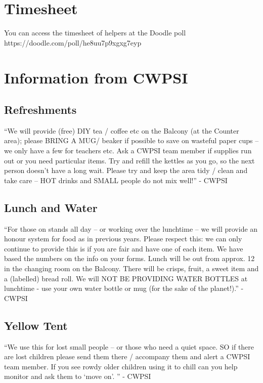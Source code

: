 \documentclass[a4paper]{article}
\begin{document}
\section*{Timesheet}
You can access the timesheet of helpers at the Doodle poll https://doodle.com/poll/he8uu7p9xgxg7eyp


\section*{Information from CWPSI}
\subsection*{Refreshments}
``We will provide (free) DIY tea / coffee etc on the Balcony (at the Counter area); please BRING A MUG/ beaker if possible to save on wasteful paper cups – we only have a few for teachers etc.   Ask a CWPSI team member if supplies run out or you need particular items.  Try and refill the kettles as you go, so the next person doesn’t have a long wait.  Please try and keep the area tidy / clean and take care – HOT drinks and SMALL people do not mix well!'' - CWPSI

\subsection*{Lunch and Water}
``For those on stands all day – or working over the lunchtime – we will provide an honour system for food as in previous years.  Please respect this: we can only continue to provide this is if you are fair and have one of each item. We have based the numbers on the info on your forms. Lunch will be out from approx. 12 in the changing room on the Balcony.  There will be crisps, fruit, a sweet item and a (labelled) bread roll.  We will NOT BE PROVIDING WATER BOTTLES at lunchtime - use your own water bottle or mug (for the sake of the planet!).'' - CWPSI

\subsection*{Yellow Tent}
``We use this for lost small people – or those who need a quiet space. SO if there are lost children please send them there / accompany them and alert a CWPSI team member.  If you see rowdy older children using it to chill can you help monitor and ask them to ‘move on’. '' - CWPSI




\end{document}
